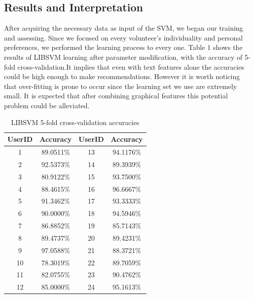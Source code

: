 

\subsection{Results and Interpretation}
After acquiring the necessary data as input of the SVM, we began our training and assessing. Since we focused on every volunteer's individuality and personal preferences, we performed  the learning process to every one. 
Table 1 shows the results of LIBSVM learning after parameter modification, with the accuracy of 5-fold cross-validation.It implies that even with text features alone the accuracies could be high enough to make recommendations. However it is worth noticing that over-fitting is prone to occur since the learning set we use are extremely small. It is expected that after combining graphical features this potential problem could be alleviated. 

\begin{table}
  \centering  %
  \begin{tabular}{c c | c c} %
    \hline                        %
    UserID & Accuracy & UserID & Accuracy \\ [0.9ex] %
    \hline                  %
    1 & 89.0511\% & 13 & 94.1176\% \\
    2 & 92.5373\% & 14 & 89.3939\% \\
    3 & 80.9122\% & 15 & 93.7500\% \\
    4 & 88.4615\% & 16 & 96.6667\% \\
    5 & 91.3462\% & 17 & 93.3333\% \\
    6 & 90.0000\% & 18 & 94.5946\% \\
    7 & 86.8852\% & 19 & 85.7143\% \\
    8 & 89.4737\% & 20 & 89.4231\% \\
    9 & 97.0588\% & 21 & 88.3721\% \\
    10 & 78.3019\% & 22 & 89.7059\% \\
    11 & 82.0755\% & 23 & 90.4762\% \\
    12 & 85.0000\% & 24 & 95.1613\% \\[1ex]  
    \hline %
  \end{tabular}
  \caption{LIBSVM 5-fold cross-validation accuracies} %
  \label{table:nonlin} %
\end{table}
